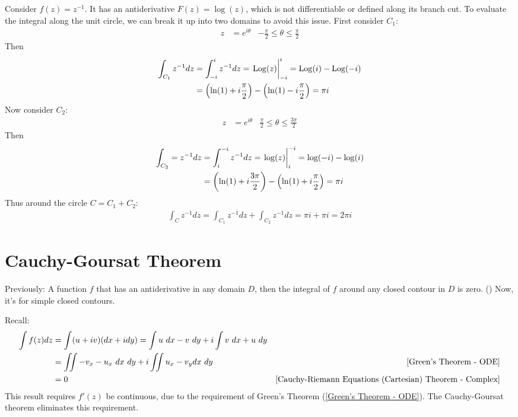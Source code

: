 \documentclass[12pt, english]{book}
\begin{document}
	\begin{example}
		Consider \(f(z) = z^{-1}\). It has an antiderivative \(F(z) = \log(z)\), which is not differentiable or defined along its branch cut. To evaluate the integral along the unit circle, we can break it up into two domains to avoid this issue. First consider \(C_1\):
		\begin{align*}
			z &= e^{i\theta} & -\frac{\pi}{2} \leq \theta \leq \frac{\pi}{2}
		\end{align*}
		Then  
		\begin{align*}
			\int_{C_1} z^{-1} dz
			&= \int_{-i}^{i} z^{-1} dz = \eval{\operatorname{Log}(z)}_{-i}^{i} = \operatorname{Log}(i) - \operatorname{Log}(-i) \\
			&= \left(\ln(1) + i\frac{\pi}{2}\right) - \left(\ln(1) - i\frac{\pi}{2}\right) = \pi i
		\end{align*}
		Now consider \(C_2\):
		\begin{align*}
			z &= e^{i\theta} & \frac{\pi}{2} \leq \theta \leq \frac{3\pi}{2}
		\end{align*}
		Then 
		\begin{align*}
			\int_{C_2} = z^{-1} dz 
			&= \int_{i}^{-i} z^{-1} dz = \eval{\log(z)}_{i}^{-i} = \log(-i) - \log(i) \\
			&= \left(\ln(1) + i\frac{3\pi}{2}\right) - \left(\ln(1) + i\frac{\pi}{2}\right) = \pi i
		\end{align*}
		Thus around the circle \(C = C_1 + C_2\):
		\begin{align*}
			\int_{C} z^{-1} dz = \int_{C_1} z^{-1} dz + \int_{C_2} z^{-1} dz = \pi i + \pi i = 2 \pi i
		\end{align*}
	\end{example}
	
	\section{Cauchy-Goursat Theorem} \label{Cauchy-Goursat Theorem Section - Complex}
	
	Previously: A function \(f\) that has an antiderivative in any domain \(D\), then the integral of \(f\) around any closed contour in \(D\) is zero. () Now, it's for simple closed contours. 
	
	Recall:
	\begin{align*}
		\int f(z) dz 
		&= \int (u + iv)(dx + i dy) = \int u \ dx - v \ dy + i\int v \ dx + u \ dy \\
		&= \iint -v_x - u_x \ dx \ dy + i \iint u_x - v_y dx \ dy 
			& \Cref{Green's Theorem - ODE} \\
		&= 0 & \Cref{Cauchy-Riemann Equations (Cartesian) Theorem - Complex}
	\end{align*}
	This result requires \(f'(z)\) be continuous, due to the requirement of Green's Theorem (\cref{Green's Theorem - ODE}). The Cauchy-Goursat theorem eliminates this requirement.
	
\end{document}

